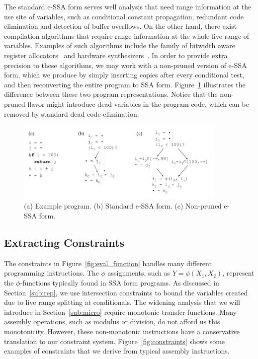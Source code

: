 \documentclass{llncs}
\begin{document}
The standard e-SSA form serves well analysis that need range information
at the use site of variables, such as conditional constant propagation,
redundant code elimination and detection of buffer overflows.
On the other hand, there exist compilation algorithms that require range
information at the whole live range of variables.
Examples of such algorithms include the family of
bitwidth aware register allocators~\cite{Barik06,Pereira08,Tallam03} and
hardware synthesizers~\cite{Cong05,Mahlke01,Stephenson00}.
In order to provide extra precision to these algorithms, we may work with a
non-pruned version of e-SSA form, which we produce by simply inserting copies
after every conditional test, and then reconverting the entire program to
SSA form.
Figure~\ref{fig:ex_non_pruned} illustrates the difference between these two
program representations.
Notice that the non-pruned flavor might introduce dead variables in the
program code, which can be removed by standard dead code elimination.

\begin{figure}[t!]
\begin{center}
\includegraphics[width=0.9\textwidth]{images/ex_non_pruned}
\end{center}
\caption{\label{fig:ex_non_pruned}
(a) Example program.
(b) Standard e-SSA form.
(c) Non-pruned e-SSA form.}
\end{figure}

\subsection{Extracting Constraints}
\label{sub:constraints}

The constraints in Figure~\ref{fig:eval_function} handles
many different programming instructions.
The $\phi$ assignments, such as $Y = \phi(X_1, X_2)$, represent
the $\phi$-functions typically found in SSA form programs.
As discussed in Section~\ref{sub:rep}, we use intersection
constraints to bound the variables created due to live range splitting
at conditionals.
The widening analysis that we will introduce in Section~\ref{sub:micro}
require monotonic transfer functions.
Many assembly operations, such as modulus or division, do not afford us
this monotonicity.
However, these non-monotonic instructions have a conservative
translation to our constraint system.
Figure~\ref{fig:constraints} shows some examples of constraints that we
derive from typical assembly instructions.
\end{document}
